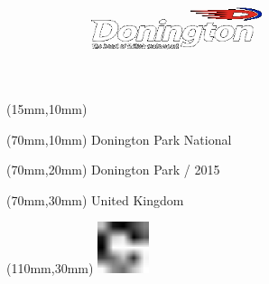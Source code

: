 \null\newpage
\begin{textblock*}{50mm}(15mm,10mm)%
\includegraphics[width=50mm]{LG/DON.png}
\end{textblock*}
\begin{textblock*}{130mm}(70mm,10mm)%
{\fontsize{20}{20}\selectfont Donington Park National}\\
\end{textblock*}
\begin{textblock*}{120mm}(70mm,20mm)%
{\fontsize{16}{16}\selectfont Donington Park / 2015}\\
\end{textblock*}
\begin{textblock*}{120mm}(70mm,30mm)%
{\fontsize{12}{12}\selectfont United Kingdom}
\end{textblock*}
\begin{textblock*}{30mm}(110mm,30mm)%
\centering
\includegraphics[height=15mm]{icons/fa-rotate-right.pdf}
\end{textblock*}
